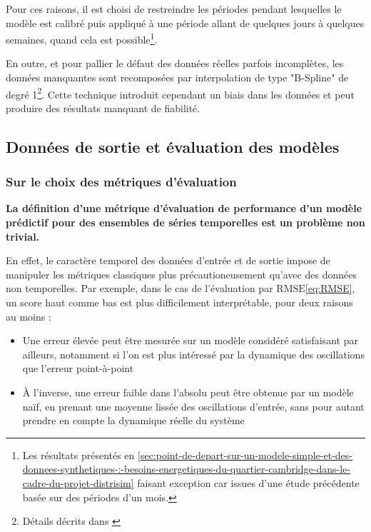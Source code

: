             Pour ces raisons, il est choisi de restreindre les périodes pendant lesquelles le modèle est calibré puis appliqué à une période allant de quelques jours à quelques semaines, quand cela est possible\footnote{Les résultats présentés en \ref{sec:point-de-depart-sur-un-modele-simple-et-des-donnees-synthetiques-:-besoins-energetiques-du-quartier-cambridge-dans-le-cadre-du-projet-distrisim} faisant exception car issues d'une étude précédente basée sur des périodes d'un mois.}.

            En outre, et pour pallier le défaut des données réelles parfois incomplètes, les données manquantes sont recomposées par interpolation de type "B-Spline" de degré 1\footnote{Détails décrits dans \cite{spline}}.
            Cette technique introduit cependant un biais dans les données et peut produire des résultats manquant de fiabilité.

    \subsection{Données de sortie et évaluation des modèles}\label{subsec:donnees-de-sortie-et-evaluation-des-modeles}
        \subsubsection{Sur le choix des métriques d'évaluation}\label{subsubsec:choix-des-metriques}
            \textbf{La définition d'une métrique d'évaluation de performance d'un modèle prédictif pour des ensembles de séries temporelles est un problème non trivial.}

            En effet, le caractère temporel des données d'entrée et de sortie impose de manipuler les métriques classiques plus précautioneusement qu'avec des données non temporelles.
            Par exemple, dans le cas de l'évaluation par $\mathrm{RMSE}$\eqref{eq:RMSE}, un score haut comme bas est plus difficilement interprétable, pour deux raisons au moins :
            \begin{itemize}
                \item Une erreur élevée peut être mesurée sur un modèle considéré satisfaisant par ailleurs, notamment si l'on est plus intéressé par la dynamique des oscillations que l'erreur point-à-point
                \item À l'inverse, une erreur faible dans l'absolu peut être obtenue par un modèle naïf, en prenant une moyenne lissée des oscillations d'entrée, sans pour autant prendre en compte la dynamique réelle du système
            \end{itemize}

